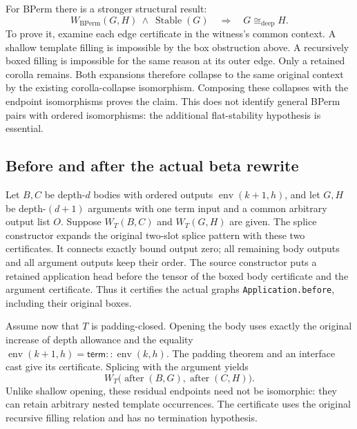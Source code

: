 
For BPerm there is a stronger structural result:
\[
 W_{\mathrm{BPerm}}(G,H)\ \land\ \operatorname{Stable}(G)
 \quad\Longrightarrow\quad G\cong_{\mathrm{deep}}H.
\]
To prove it, examine each edge certificate in the witness's common context.
A shallow template filling is impossible by the box obstruction above.
A recursively boxed filling is impossible for the same reason at its outer
edge. Only a retained corolla remains. Both expansions therefore collapse to
the same original context by the existing corolla-collapse isomorphism.
Composing these collapses with the endpoint isomorphisms proves the claim.
This does not identify general BPerm pairs with ordered isomorphisms: the
additional flat-stability hypothesis is essential.


\subsection{Before and after the actual beta rewrite}
Let $B,C$ be depth-$d$ bodies with ordered outputs
$\operatorname{env}(k+1,h)$, and let $G,H$ be depth-$(d+1)$ arguments with one
term input and a common arbitrary output list $O$. Suppose $W_T(B,C)$ and
$W_T(G,H)$ are given. The splice constructor expands the original two-slot
splice pattern with these two certificates. It connects exactly bound output
zero; all remaining body outputs and all argument outputs keep their order.
The source constructor puts a retained application head before the tensor
of the boxed body certificate and the argument certificate. Thus it certifies
the actual graphs \texttt{Application.before}, including their original boxes.


Assume now that $T$ is padding-closed. Opening the body uses exactly the
original increase of depth allowance and
the equality $\operatorname{env}(k+1,h)=\mathsf{term}::\operatorname{env}(k,h)$.
The padding theorem and an interface cast give its certificate. Splicing with
the argument yields
\[
 W_T\bigl(\operatorname{after}(B,G),\operatorname{after}(C,H)\bigr).
\]
Unlike shallow opening, these residual endpoints need not be isomorphic:
they can retain arbitrary nested template occurrences. The certificate uses
the original recursive filling relation and has no termination hypothesis.

